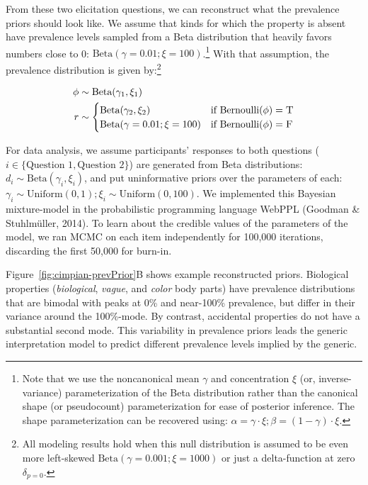 \documentclass[floatsintext,doc]{apa6}
\theoremstyle{definition}
\theoremstyle{definition}
\theoremstyle{definition}
\theoremstyle{remark}
\begin{document}
From these two elicitation questions, we can reconstruct what the
prevalence priors should look like. We assume that kinds for which the
property is absent have prevalence levels sampled from a Beta
distribution that heavily favors numbers close to 0:
\(\text{Beta}(\gamma = 0.01; \xi = 100)\).\footnote{Note that we use the
  noncanonical mean \(\gamma\) and concentration \(\xi\) (or,
  inverse-variance) parameterization of the Beta distribution rather
  than the canonical shape (or pseudocount) parameterization for ease of
  posterior inference. The shape parameterization can be recovered
  using: \(\alpha = \gamma \cdot \xi; \beta = (1 - \gamma) \cdot \xi\).}
With that assumption, the prevalence distribution is given by:\footnote{All
  modeling results hold when this null distribution is assumed to be
  even more left-skewed \(\text{Beta}(\gamma = 0.001; \xi = 1000)\) or
  just a delta-function at zero \(\delta_{p=0}\).}

\begin{align}
\phi & \sim \text{Beta}(\gamma_1, \xi_1) \nonumber \\ 
r & \sim \begin{cases}
        \text{Beta}(\gamma_2, \xi_2) &\mbox{if } \text{Bernoulli}(\phi) = \textsc{T} \label{eq:priorModel}  \\
        \text{Beta}(\gamma = 0.01; \xi = 100) &\mbox{if } \text{Bernoulli}(\phi) = \textsc{F} \\
        \end{cases}
\end{align}

For data analysis, we assume participants' responses to both questions
(\(i \in \{\text{Question 1}, \text{Question 2}\}\)) are generated from
Beta distributions: \(d_{i} \sim \text{Beta}(\gamma_i, \xi_i)\), and put
uninformative priors over the parameters of each:
\(\gamma_i \sim \text{Uniform}(0, 1); \xi_i \sim \text{Uniform}(0, 100)\).
We implemented this Bayesian mixture-model in the probabilistic
programming language WebPPL (Goodman \& Stuhlmüller, 2014). To learn
about the credible values of the parameters of the model, we ran MCMC on
each item independently for 100,000 iterations, discarding the first
50,000 for burn-in.

Figure~\ref{fig:cimpian-prevPrior}B shows example reconstructed priors.
Biological properties (\emph{biological}, \emph{vague}, and \emph{color}
body parts) have prevalence distributions that are bimodal with peaks at
0\% and near-100\% prevalence, but differ in their variance around the
100\%-mode. By contrast, accidental properties do not have a substantial
second mode. This variability in prevalence priors leads the generic
interpretation model to predict different prevalence levels implied by
the generic.
\end{document}
